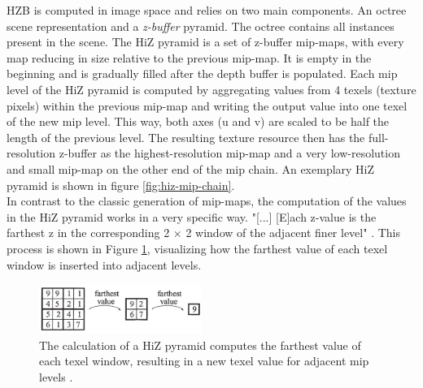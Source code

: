 \noindent
\ac{HZB} is computed in image space and relies on two main components. An octree scene representation and a 
\emph{z-buffer} pyramid. The octree contains all instances present in the scene. The \ac{HiZ} pyramid is a set of 
z-buffer mip-maps, with every map reducing in size relative to the previous mip-map. It is empty in the beginning 
and is gradually filled after the depth buffer is populated. Each mip level of the \ac{HiZ} pyramid is computed by 
aggregating values from 4 texels (texture pixels) within the previous mip-map and writing the output value into one 
texel of the new mip level. This way, both axes (u and v) are scaled to be half the length of the previous level. 
The resulting texture resource then has the full-resolution z-buffer as the highest-resolution mip-map and a very 
low-resolution and small mip-map on the other end of the mip chain. An exemplary \ac{HiZ} pyramid is shown in figure 
\ref{fig:hiz-mip-chain}.\\

\noindent
In contrast to the classic generation of mip-maps, the computation of the values in the \ac{HiZ} pyramid works in a 
very specific way. "[...] [E]ach z-value is the farthest z in the corresponding 2 \begin{math}\times\end{math} 2 window 
of the adjacent finer level" \cite{AkenineMoeller2018}. This process is shown in Figure \ref{fig:hiz-value-computation}, 
visualizing how the farthest value of each texel window is inserted into adjacent levels.\\

\begin{figure}[!]
    \centering
    \includegraphics[width=200px]{images/graphics/hiz-buf-values.jpg}
    \caption{The calculation of a \ac{HiZ} pyramid computes the farthest value of each texel window, 
    resulting in a new texel value for adjacent mip levels \cite{AkenineMoeller2018}.}
    \label{fig:hiz-value-computation}
\end{figure}


